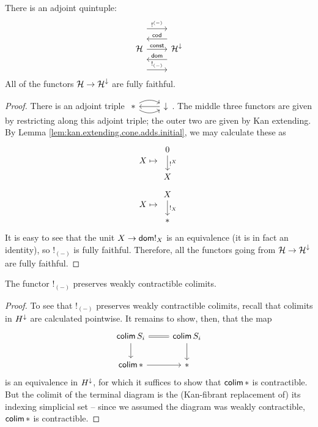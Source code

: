 \begin{prop}
  There is an adjoint quintuple:
  \[
    \begin{tikzcd}
      \Ha \arrow[r, "\const"] \arrow[r, leftarrow, shift left = 5,
      "\term{cod}"] \arrow[r, leftarrow, shift right = 5, "\term{dom}"]
      \arrow[r, shift left = 10, "!^{(-)}"]  \arrow[r, shift right = 10, "!_{(-)}"] & \Ha^{\down}
    \end{tikzcd}
  \]
  All of the functors $\operatorname{\mathcal{H}} \to \operatorname{\mathcal{H}}^{\mathbin{\downarrow}}$ are fully faithful.
\end{prop}
\begin{proof}
There is an adjoint triple $\begin{tikzcd} \ast \arrow[r,leftarrow] \arrow[r,
  bend left] \arrow[r, bend right] & \down \end{tikzcd}$. The middle three
functors are given by restricting along this adjoint triple; the outer two are
given by Kan extending. By Lemma \ref{lem:kan.extending.cone.adds.initial}, we
may calculate these as
  $$X \mapsto \begin{tikzcd} 0 \arrow[d, "!^X"] \\ X \end{tikzcd}$$
  $$X \mapsto \begin{tikzcd} X \arrow[d, "!_X"] \\ \ast \end{tikzcd}$$
It is easy to see that the unit $X \to \mathsf{{dom}} !_{X}$ is an equivalence (it is in
fact an identity), so $!_{(-)}$ is fully faithful. Therefore, all the functors
going from $\operatorname{\mathcal{H}} \to \operatorname{\mathcal{H}}^{\mathbin{\downarrow}}$ are fully faithful.
\end{proof}


\begin{prop}\label{lem:bang.preserves.weakly.contractible.colimits}
  The functor $!_{(-)}$ preserves weakly contractible colimits.
\end{prop}
\begin{proof}
  To see that $!_{(-)}$ preserves weakly contractible colimits, recall that colimits in $H^{\mathbin{\downarrow}}$ are calculated pointwise. It remains to show, then, that the map
  \[
    \begin{tikzcd}
    \colim S_i \arrow[r, equals] \arrow[d] & \colim S_i \arrow[d] \\
    \colim \ast \arrow[r] & \ast 
    \end{tikzcd}
  \]
  is an equivalence in $H^{\mathbin{\downarrow}}$, for which it suffices to show that $\operatorname{\mathsf{colim}} \ast$ is contractible. But the colimit of the terminal diagram is the (Kan-fibrant replacement of) its indexing simplicial set -- since we assumed the diagram was weakly contractible, $\operatorname{\mathsf{colim}} \ast$ is contractible.
\end{proof}


